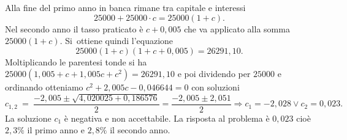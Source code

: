 \begin{soluzione}
Alla fine del primo anno in banca rimane tra capitale e interessi \[25000 + 
25000 \cdot c = 25000 ( 1 + c ).\] Nel secondo anno il tasso praticato è 
\(c+0,005\) che va applicato alla somma \(25000(1+c)\). Si~ottiene quindi 
l'equazione \[25000 ( 1 + c ) ( 1 + c + 0,005 ) = 26291,10.\]
Moltiplicando le parentesi tonde si ha \(25000 ( 1,005 + c + 1,005 c + c^{2} ) = 
26291,10\) e poi dividendo per \(25000\) e ordinando otteniamo
\(c^{2} + 2,005 c - 0,046644=0\) con soluzioni
\[c_{1,2}~=~\dfrac{- 2,005 \pm \sqrt{4,020025 + 0,186576}}{2} = \dfrac{-2,005 
\pm 2,051}{2}\Rightarrow c_{1} = - 2,028 \vee c_{2} = 0,023.\]
La soluzione \(c_1\) è negativa e non accettabile. La risposta al problema è 
\(0,023\) cioè \(2,3\%\) il primo anno e \(2,8\%\) il secondo anno.
\end{soluzione}
% 
% 
% 
